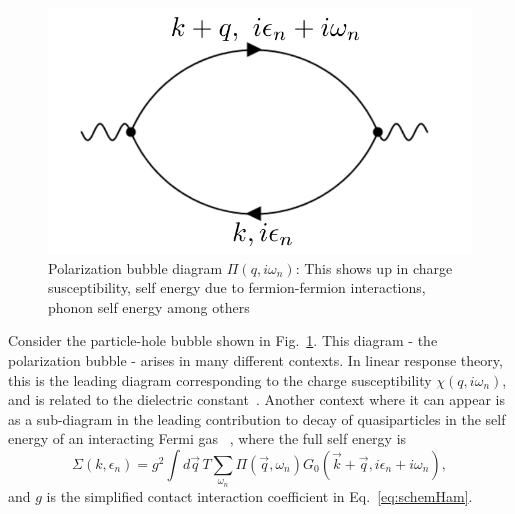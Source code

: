 \begin{figure}[h!]
    \centering
    \includegraphics[width=0.8\linewidth]{figures/introduction/LabeledChiQOmdiagramv2.pdf}
    \caption{Polarization bubble diagram $\Pi(q,i\omega_n)$: This shows up in charge susceptibility, self energy due to fermion-fermion interactions, phonon self energy among others}
    \label{fig:PHbubblediagram}
\end{figure}
Consider the particle-hole bubble shown in Fig.~\ref{fig:PHbubblediagram}. This diagram - the polarization bubble - arises in many different contexts. In linear response theory, this is the leading diagram corresponding to the charge susceptibility $\chi(q,i\omega_n)$, and is related to the dielectric constant~\cite{coleman2015introduction}. Another context where it can appear is as a sub-diagram in the leading contribution to decay of quasiparticles in the self energy of an interacting Fermi gas ~\cite{Sachdev_2011}, where the full self energy is
\begin{equation}
\Sigma(k,\epsilon_n) = g^2\int d\vec{q} \,T\sum_{\omega_n}\Pi(\vec{q},\omega_n)G_0(\vec{k}+\vec{q},i\epsilon_n + i\omega_n), 
\end{equation}
and $g$ is the simplified contact interaction coefficient in Eq.~\eqref{eq:schemHam}.

